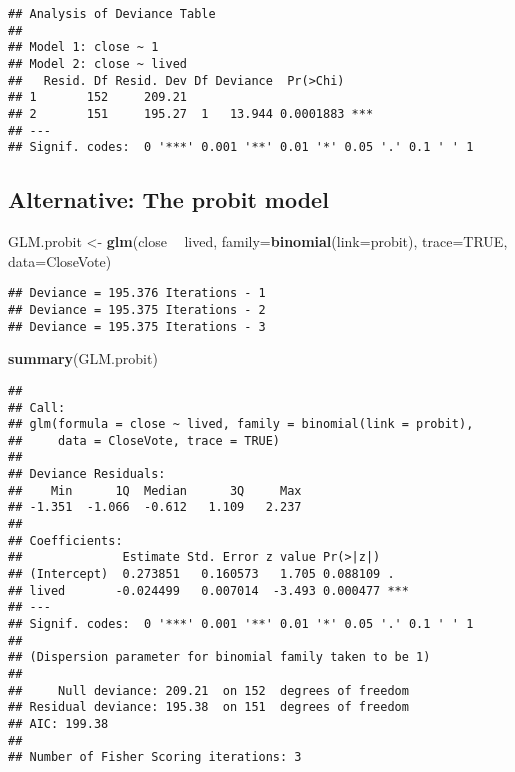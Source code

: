 \documentclass[
]{article}
\newenvironment{Shaded}{\begin{snugshade}}{\end{snugshade}}
\newcommand{\DataTypeTok}[1]{\textcolor[rgb]{0.13,0.29,0.53}{#1}}
\newcommand{\KeywordTok}[1]{\textcolor[rgb]{0.13,0.29,0.53}{\textbf{#1}}}
\newcommand{\NormalTok}[1]{#1}
\newcommand{\OperatorTok}[1]{\textcolor[rgb]{0.81,0.36,0.00}{\textbf{#1}}}
\newcommand{\OtherTok}[1]{\textcolor[rgb]{0.56,0.35,0.01}{#1}}
\newcommand{\StringTok}[1]{\textcolor[rgb]{0.31,0.60,0.02}{#1}}
\begin{document}
\begin{verbatim}
## Analysis of Deviance Table
## 
## Model 1: close ~ 1
## Model 2: close ~ lived
##   Resid. Df Resid. Dev Df Deviance  Pr(>Chi)    
## 1       152     209.21                          
## 2       151     195.27  1   13.944 0.0001883 ***
## ---
## Signif. codes:  0 '***' 0.001 '**' 0.01 '*' 0.05 '.' 0.1 ' ' 1
\end{verbatim}

\hypertarget{alternative-the-probit-model}{%
\subsection{Alternative: The probit
model}\label{alternative-the-probit-model}}

\begin{Shaded}
\begin{Highlighting}[]
\NormalTok{GLM.probit <-}\StringTok{ }\KeywordTok{glm}\NormalTok{(close }\OperatorTok{~}\StringTok{ }\NormalTok{lived, }\DataTypeTok{family=}\KeywordTok{binomial}\NormalTok{(}\DataTypeTok{link=}\NormalTok{probit), }\DataTypeTok{trace=}\OtherTok{TRUE}\NormalTok{, }\DataTypeTok{data=}\NormalTok{CloseVote)}
\end{Highlighting}
\end{Shaded}

\begin{verbatim}
## Deviance = 195.376 Iterations - 1
## Deviance = 195.375 Iterations - 2
## Deviance = 195.375 Iterations - 3
\end{verbatim}

\begin{Shaded}
\begin{Highlighting}[]
\KeywordTok{summary}\NormalTok{(GLM.probit)}
\end{Highlighting}
\end{Shaded}

\begin{verbatim}
## 
## Call:
## glm(formula = close ~ lived, family = binomial(link = probit), 
##     data = CloseVote, trace = TRUE)
## 
## Deviance Residuals: 
##    Min      1Q  Median      3Q     Max  
## -1.351  -1.066  -0.612   1.109   2.237  
## 
## Coefficients:
##              Estimate Std. Error z value Pr(>|z|)    
## (Intercept)  0.273851   0.160573   1.705 0.088109 .  
## lived       -0.024499   0.007014  -3.493 0.000477 ***
## ---
## Signif. codes:  0 '***' 0.001 '**' 0.01 '*' 0.05 '.' 0.1 ' ' 1
## 
## (Dispersion parameter for binomial family taken to be 1)
## 
##     Null deviance: 209.21  on 152  degrees of freedom
## Residual deviance: 195.38  on 151  degrees of freedom
## AIC: 199.38
## 
## Number of Fisher Scoring iterations: 3
\end{verbatim}
\end{document}
